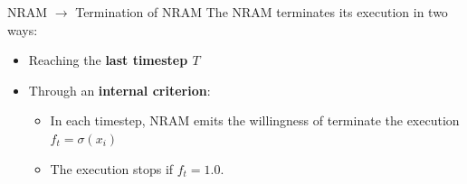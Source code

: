 \documentclass[xcolor={usenames}]{beamer}
\begin{document}

  \begin{frame}{NRAM \(\rightarrow\) Termination of NRAM}
  	The NRAM terminates its execution in two ways:
  	\begin{itemize}
  		\item{Reaching the \textbf{last timestep $T$}}
  		\item{Through an \textbf{internal criterion}:
			\begin{itemize}
				\item{In each timestep, NRAM emits the willingness of terminate the execution $f_t = \sigma(x_i)$}
				\item{The execution stops if $f_t = 1.0$.}		
			\end{itemize}}
  	\end{itemize}
  \end{frame}
\end{document}
